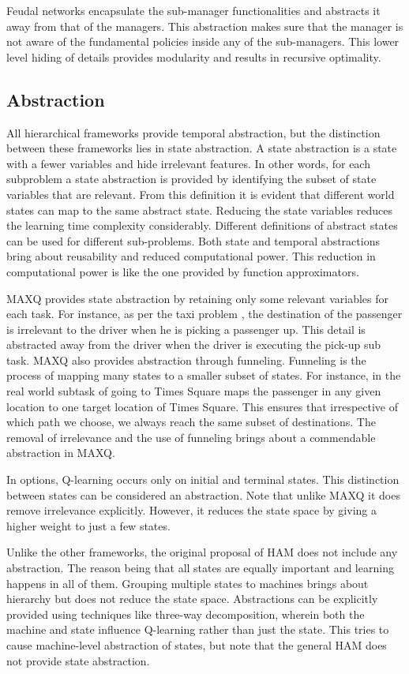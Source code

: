 Feudal networks encapsulate the sub-manager functionalities and abstracts it away from that of the managers. This abstraction makes sure that the manager is not aware of the fundamental policies inside any of the sub-managers. This lower level hiding of details provides modularity and results in recursive optimality.

\subsection{Abstraction}

All hierarchical frameworks provide temporal abstraction, but the distinction between these frameworks lies in state abstraction. A state abstraction is a state with a fewer variables and hide irrelevant features. In other words, for each subproblem a state abstraction is provided by identifying the subset of state variables that are relevant. From this definition it is evident that different world states can map to the same abstract state. Reducing the state variables reduces the learning time complexity considerably. Different definitions of abstract states can be used for different sub-problems. Both state and temporal abstractions bring about reusability and reduced computational power. This reduction in computational power is like the one provided by function approximators.

MAXQ provides state abstraction by retaining only some relevant variables for each task. For instance, as per the taxi problem \cite{Dietterich}, the destination of the passenger is irrelevant to the driver when he is picking a passenger up. This detail is abstracted away from the driver when the driver is executing the pick-up sub task. MAXQ also provides abstraction through funneling. Funneling is the process of mapping many states to a smaller subset of states. For instance, in the real world subtask of going to Times Square maps the passenger in any given location to one target location of Times Square. This ensures that irrespective of which path we choose, we always reach the same subset of destinations. The removal of irrelevance and the use of funneling brings about a commendable abstraction in MAXQ.

In options, Q-learning occurs only on initial and terminal states. This distinction between states can be considered an abstraction. Note that unlike MAXQ it does remove irrelevance explicitly. However, it reduces the state space by giving a higher weight to just a few states.

Unlike the other frameworks, the original proposal of HAM does not include any abstraction. The reason being that all states are equally important and learning happens in all of them. Grouping multiple states to machines brings about hierarchy but does not reduce the state space. Abstractions can be explicitly provided using techniques like three-way decomposition, wherein both the machine and state influence Q-learning rather than just the state. This tries to cause machine-level abstraction of states, but note that the general HAM does not provide state abstraction.

